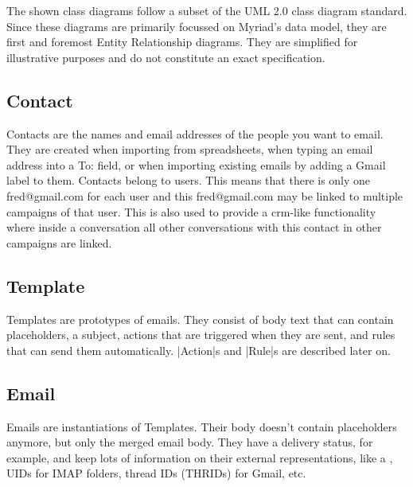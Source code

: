 The shown class diagrams follow a subset of the UML 2.0 class diagram standard\cite{uml}. Since these diagrams are primarily focussed on Myriad's data model, they are first and foremost Entity Relationship diagrams. They are simplified for illustrative purposes and do not constitute an exact specification.



\subsection{Contact}

Contacts are the names and email addresses of the people you want to email.
They are created when importing from spreadsheets, when typing an email address into a To: field, or when importing existing emails by adding a Gmail label to them. Contacts belong to users. This means that there is only one fred@gmail.com for each user and this fred@gmail.com may be linked to multiple campaigns of that user. This is also used to provide a \gls{crm}-like functionality where inside a conversation all other conversations with this contact in other campaigns are linked.

\subsection{Template}

Templates are prototypes of emails. They consist of body text that can contain placeholders, a subject, actions that are triggered when they are sent, and rules that can send them automatically. |Action|s and |Rule|s are described later on.

\subsection{Email}

Emails are instantiations of Templates. Their body doesn’t contain placeholders anymore, but only the merged email body. They have a delivery status, for example, and keep lots of information on their external representations, like a , UIDs for IMAP folders, thread IDs (THRIDs) for Gmail, etc.


